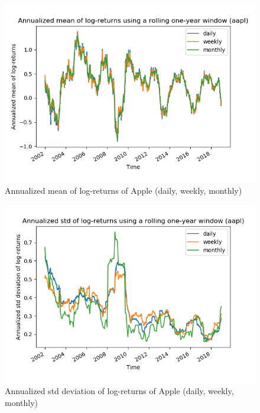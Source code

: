 \documentclass[10pt]{article}
\newenvironment{exercise}[2][Exercise]{\begin{trivlist}
  \item[\hskip \labelsep {\bfseries #1}\hskip \labelsep {\bfseries #2.}]}{\end{trivlist}}
\begin{document}
\begin{exercise}{4}
	\begin{figure}[H]
	
		\centering
		\includegraphics[scale=0.5]{Figures/problem4d_mean_aapl.png}	
		\caption{Annualized mean of log-returns of Apple (daily, weekly, monthly)}	
		\label{fig:problem3d_mean_aapl}
	
	\end{figure}
	
	\begin{figure}[H]
	
		\centering
		\includegraphics[scale=0.5]{Figures/problem4d_std_aapl.png}	
		\caption{Annualized std deviation of log-returns of Apple (daily, weekly, monthly)}	
		\label{fig:problem3d_std_aapl}
	
	\end{figure}
		

\end{exercise}
\end{document}
